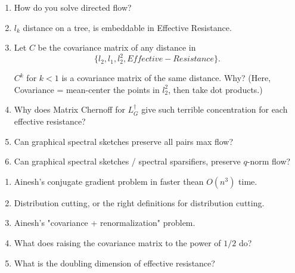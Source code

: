 \documentclass[12pt]{article}
\begin{document}
\begin{enumerate}
\item How do you solve directed flow?
\item $l_k$ distance on a tree, is embeddable in Effective Resistance.
\item Let $C$ be the covariance matrix of any distance in 
\[ \{l_2, l_1, l_2^2, Effective-Resistance\}. \]

$C^k$ for $k < 1$ is a covariance matrix of the same distance.
Why?  (Here, Covariance = mean-center the points in $l_2^2$, then
    take dot products.)
\item Why does Matrix Chernoff for $L_G^\dag$ give such terrible
concentration for each effective resistance?
\item Can graphical spectral sketches preserve all pairs max flow?
\item Can graphical spectral sketches / spectral sparsifiers, preserve
$q$-norm flow?
\end{enumerate}

\begin{enumerate}
\item Ainesh's conjugate gradient problem in faster thean
$O(n^3)$ time.
\item Distribution cutting, or the right definitions for
distribution cutting.
\item Ainesh's "covariance + renormalization" problem.
\item What does raising the covariance matrix to the power of
$1/2$ do?
\item What is the doubling dimension of effective resistance?
\end{enumerate}
\end{document}
